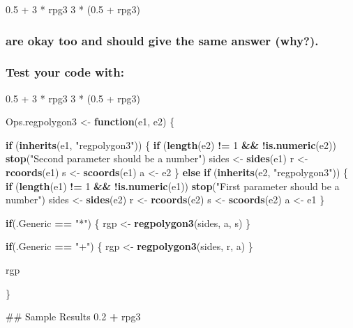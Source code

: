\documentclass[]{article}
\newenvironment{Shaded}{\begin{snugshade}}{\end{snugshade}}
\newcommand{\KeywordTok}[1]{\textcolor[rgb]{0.13,0.29,0.53}{\textbf{#1}}}
\newcommand{\DecValTok}[1]{\textcolor[rgb]{0.00,0.00,0.81}{#1}}
\newcommand{\FloatTok}[1]{\textcolor[rgb]{0.00,0.00,0.81}{#1}}
\newcommand{\StringTok}[1]{\textcolor[rgb]{0.31,0.60,0.02}{#1}}
\newcommand{\ControlFlowTok}[1]{\textcolor[rgb]{0.13,0.29,0.53}{\textbf{#1}}}
\newcommand{\OperatorTok}[1]{\textcolor[rgb]{0.81,0.36,0.00}{\textbf{#1}}}
\newcommand{\NormalTok}[1]{#1}
\begin{document}
0.5 + 3 * rpg3 3 * (0.5 + rpg3)

\subsubsection{are okay too and should give the same answer
(why?).}\label{are-okay-too-and-should-give-the-same-answer-why.}

\subsubsection{Test your code with:}\label{test-your-code-with}

0.5 + 3 * rpg3 3 * (0.5 + rpg3)

\begin{Shaded}
\begin{Highlighting}[]
\NormalTok{Ops.regpolygon3 <-}\StringTok{ }\ControlFlowTok{function}\NormalTok{(e1, e2) \{}

  \ControlFlowTok{if}\NormalTok{ (}\KeywordTok{inherits}\NormalTok{(e1, }\StringTok{"regpolygon3"}\NormalTok{)) \{ }
    \ControlFlowTok{if}\NormalTok{ (}\KeywordTok{length}\NormalTok{(e2) }\OperatorTok{!=}\StringTok{ }\DecValTok{1} \OperatorTok{&&}\StringTok{ }\OperatorTok{!}\KeywordTok{is.numeric}\NormalTok{(e2)) }
      \KeywordTok{stop}\NormalTok{(}\StringTok{"Second parameter should be a number"}\NormalTok{) }
\NormalTok{    sides <-}\StringTok{ }\KeywordTok{sides}\NormalTok{(e1)}
\NormalTok{    r <-}\StringTok{ }\KeywordTok{rcoords}\NormalTok{(e1)}
\NormalTok{    s <-}\StringTok{ }\KeywordTok{scoords}\NormalTok{(e1)}
\NormalTok{    a <-}\StringTok{ }\NormalTok{e2}
\NormalTok{  \} }\ControlFlowTok{else} \ControlFlowTok{if}\NormalTok{ (}\KeywordTok{inherits}\NormalTok{(e2, }\StringTok{"regpolygon3"}\NormalTok{)) \{ }
    \ControlFlowTok{if}\NormalTok{ (}\KeywordTok{length}\NormalTok{(e1) }\OperatorTok{!=}\StringTok{ }\DecValTok{1} \OperatorTok{&&}\StringTok{ }\OperatorTok{!}\KeywordTok{is.numeric}\NormalTok{(e1)) }
      \KeywordTok{stop}\NormalTok{(}\StringTok{"First parameter should be a number"}\NormalTok{) }
\NormalTok{    sides <-}\StringTok{ }\KeywordTok{sides}\NormalTok{(e2)}
\NormalTok{    r <-}\StringTok{ }\KeywordTok{rcoords}\NormalTok{(e2)}
\NormalTok{    s <-}\StringTok{ }\KeywordTok{scoords}\NormalTok{(e2)}
\NormalTok{    a <-}\StringTok{ }\NormalTok{e1}
\NormalTok{  \}}
  
  \ControlFlowTok{if}\NormalTok{(.Generic }\OperatorTok{==}\StringTok{ "*"}\NormalTok{) \{}
\NormalTok{    rgp <-}\StringTok{ }\KeywordTok{regpolygon3}\NormalTok{(sides, a, s)}
\NormalTok{  \}}
  
  \ControlFlowTok{if}\NormalTok{(.Generic }\OperatorTok{==}\StringTok{ "+"}\NormalTok{) \{}
\NormalTok{    rgp <-}\StringTok{ }\KeywordTok{regpolygon3}\NormalTok{(sides, r, a)}
\NormalTok{  \}}
  
\NormalTok{  rgp}

\NormalTok{\}}

\NormalTok{## Sample Results}
\FloatTok{0.2} \OperatorTok{+}\StringTok{ }\NormalTok{rpg3}
\end{Highlighting}
\end{Shaded}
\end{document}
